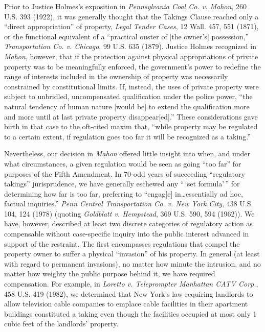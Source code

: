 Prior to Justice Holmes's exposition in \textit{Pennsylvania Coal Co. v. Mahon},
260 U.S. 393 (1922), it was generally thought that the Takings Clause reached
only a ``direct appropriation'' of property, \textit{Legal Tender Cases}, 12
Wall. 457, 551 (1871), or the functional equivalent of a ``practical ouster of
[the owner's] possession,'' \textit{Transportation Co. v. Chicago}, 99 U.S. 635
(1879). Justice Holmes recognized in \textit{Mahon}, however, that if the
protection against physical appropriations of private property was to be
meaningfully enforced, the government's power to redefine the range of interests
included in the ownership of property was necessarily constrained by
constitutional limits. If, instead, the uses of private property were subject to
unbridled, uncompensated qualification under the police power, ``the natural
tendency of human nature [would be] to extend the qualification more and more
until at last private property disappear[ed].'' These considerations gave birth
in that case to the oft-cited maxim that, ``while property may be regulated to a
certain extent, if regulation goes too far it will be recognized as a taking.'' 

Nevertheless, our decision in \textit{Mahon} offered little insight into when,
and under what circumstances, a given regulation would be seen as going ``too
far'' for purposes of the Fifth Amendment. In 70-odd years of succeeding
``regulatory takings'' jurisprudence, we have generally eschewed any ``\,`set
formula'\,'' for determining how far is too far, preferring to ``engag[e]
in\ldots essentially ad hoc, factual inquiries.'' \textit{Penn Central
Transportation Co. v. New York City}, 438 U.S. 104, 124 (1978) (quoting
\textit{Goldblatt v. Hempstead}, 369 U.S. 590, 594 (1962)). We have, however,
described at least two discrete categories of regulatory action as compensable
without case-specific inquiry into the public interest advanced in support of
the restraint. The first encompasses regulations that compel the property owner
to suffer a physical ``invasion'' of his property. In general (at least with
regard to permanent invasions), no matter how minute the intrusion, and no
matter how weighty the public purpose behind it, we have required compensation.
For example, in \textit{Loretto v. Teleprompter Manhattan CATV Corp.}, 458 U.S.
419 (1982), we determined that New York's law requiring landlords to allow
television cable companies to emplace cable facilities in their apartment
buildings constituted a taking even though the facilities occupied at most only
1 {\textonehalf} cubic feet of the landlords' property.


